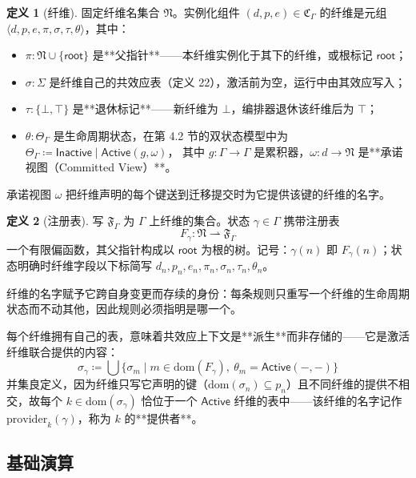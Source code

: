 \documentclass[11pt,a4paper]{article}
\theoremstyle{plain}
\theoremstyle{definition}
\newtheorem{definition}{定义}
\theoremstyle{remark}
\begin{document}
\begin{definition}[纤维]
固定纤维名集合 $\mathfrak{N}$。实例化组件 $(d, p, e) \in \mathfrak{C}_\Gamma$ 的纤维是元组 $\langle d, p, e, \pi, \sigma, \tau, \theta \rangle$，其中：
\begin{itemize}
\item $\pi : \mathfrak{N} \cup \{\mathsf{root}\}$ 是**父指针**——本纤维实例化于其下的纤维，或根标记 $\mathsf{root}$；
\item $\sigma : \Sigma$ 是纤维自己的共效应表（定义 22），激活前为空，运行中由其效应写入；
\item $\tau : \{\bot, \top\}$ 是**退休标记**——新纤维为 $\bot$，编排器退休该纤维后为 $\top$；
\item $\theta : \Theta_\Gamma$ 是生命周期状态，在第 4.2 节的双状态模型中为
$\Theta_\Gamma \coloneqq \mathsf{Inactive} \mid \mathsf{Active}(g, \omega)$，
其中 $g : \Gamma \to \Gamma$ 是累积器，$\omega : d \to \mathfrak{N}$ 是**承诺视图（Committed View）**。
\end{itemize}
\end{definition}

承诺视图 $\omega$ 把纤维声明的每个键送到迁移提交时为它提供该键的纤维的名字。

\begin{definition}[注册表]
写 $\mathfrak{F}_\Gamma$ 为 $\Gamma$ 上纤维的集合。状态 $\gamma \in \Gamma$ 携带注册表
\[
F_\gamma : \mathfrak{N} \rightharpoonup \mathfrak{F}_\Gamma \tag{39}
\]
一个有限偏函数，其父指针构成以 $\mathsf{root}$ 为根的树。记号：$\gamma(n)$ 即 $F_\gamma(n)$；状态明确时纤维字段以下标简写 $d_n, p_n, e_n, \pi_n, \sigma_n, \tau_n, \theta_n$。
\end{definition}

纤维的名字赋予它跨自身变更而存续的身份：每条规则只重写一个纤维的生命周期状态而不动其他，因此规则必须指明是哪一个。

每个纤维拥有自己的表，意味着共效应上下文是**派生**而非存储的——它是激活纤维联合提供的内容：
\[
\sigma_\gamma \coloneqq \bigcup \{\sigma_m \mid m \in \mathrm{dom}(F_\gamma),\ \theta_m = \mathsf{Active}(-,-)\} \tag{40}
\]
并集良定义，因为纤维只写它声明的键（$\mathrm{dom}(\sigma_n) \subseteq p_n$）且不同纤维的提供不相交，故每个 $k \in \mathrm{dom}(\sigma_\gamma)$ 恰位于一个 $\mathsf{Active}$ 纤维的表中——该纤维的名字记作 $\mathrm{provider}_k(\gamma)$，称为 $k$ 的**提供者**。

\subsection{基础演算}
\end{document}
